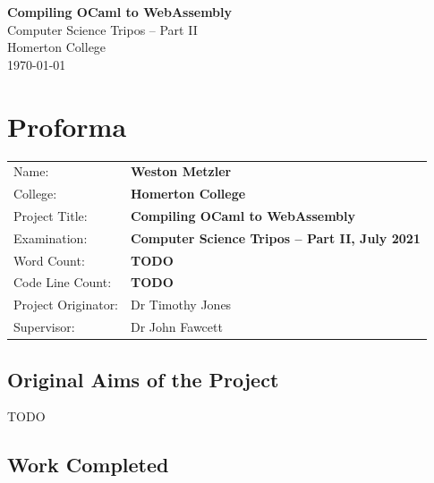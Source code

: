 \documentclass[12pt,a4paper,twoside,openright]{report}
\begin{document}





\pagestyle{empty}


\vspace*{60mm}
\begin{center}
\Huge
\textbf{Compiling OCaml to WebAssembly} \\[5mm]
Computer Science Tripos -- Part II \\[5mm]
Homerton College \\[5mm]
\today  %
\end{center}


\pagestyle{plain}

\chapter*{Proforma}

{\large
\begin{tabular}{ll}
Name:               & \bf Weston Metzler                       \\
College:            & \bf Homerton College                      \\
Project Title:      & \bf Compiling OCaml to WebAssembly         \\
Examination:        & \bf Computer Science Tripos -- Part II, July 2021  \\
Word Count:         & \bf TODO \\
Code Line Count:    & \bf TODO \\
Project Originator: & Dr Timothy Jones                    \\
Supervisor:         & Dr John Fawcett                    \\
\end{tabular}
}

\section*{Original Aims of the Project}

TODO

\section*{Work Completed}
\end{document}
